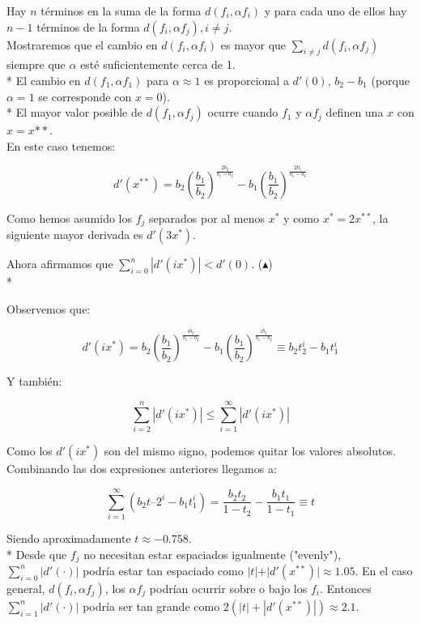 \documentclass[11pt,a4paper]{article}
\begin{document}
\noindent Hay $n$ términos en la suma de la forma $d(f_i, \alpha f_i)$ y para cada uno de ellos hay $n-1$ términos de la forma $d(f_i, \alpha f_j), i \neq j$.\\
Mostraremos que el cambio en $d(f_i, \alpha f_i)$  es mayor que $\sum_{ i \neq j}{ d(f_i, \alpha f_j)}$ siempre que $\alpha$ esté suficientemente cerca de 1. \\*
\noindent El cambio en $d(f_1, \alpha f_1)$ para $\alpha \approx 1$ es proporcional a $d'(0)$, $b_2 - b_1$ (porque $\alpha = 1$ se corresponde con $x = 0$).\\*
\noindent El mayor valor posible de $d(f_1, \alpha f_j)$  ocurre cuando $f_1$ y $\alpha f_j$ definen una $x$ con $x = x{**}$.\\
\noindent En este caso tenemos:

\begin{equation*}
    d'(x^{**}) = b_2 (\frac{b_1}{b_2})^{\frac{2 b_2}{b_1 - b_2}} - b_1 (\frac{b_1}{b_2})^{\frac{2 b_1}{b_1 - b_2}}
\end{equation*}

\noindent Como hemos asumido los $f_j$ separados por al menos $x^{*}$ y como $x^{*} = 2 x^{**}$, la siguiente mayor derivada es $d'(3 x^{*})$. 

\noindent Ahora afirmamos que $\sum_{i=0}^{n} | d'(ix^{*}) | < d'(0)$. ($\blacktriangle$) \\*

\noindent Observemos que:

\begin{equation*}
    d'(ix^{*}) = b_2 \left(\frac{b_1}{b_2} \right)^{\frac{ib_2}{b_1 - b_2}} - b_1 \left( \frac{b_1}{b_2} \right)^{\frac{ib_1}{b_1 - b_2}} \equiv b_2 t_2^{i} - b_1 t_1^{i}
\end{equation*}

Y también:

\begin{equation*}
    \sum_{i = 2}^{n}{ | d'(ix^{*}) |} \leq \sum_{i = 1}^{\infty}{ | d'(ix^{*}) |}
\end{equation*}

Como los $d'(ix^{*})$ son del mismo signo, podemos quitar los valores absolutos. Combinando las dos expresiones anteriores llegamos a:

\begin{equation*}
    \sum_{i = 1}^{\infty}{(b_2t–2^{i} - b_1t_1^{i})} = \frac{b_2t_2}{1-t_2} - \frac{b_1t_1}{1-t_1} \equiv t
\end{equation*}

\noindent Siendo aproximadamente $t \approx -0.758$. \\*
\noindent Desde que $f_j$ no necesitan estar espaciados igualmente ("evenly"), $\sum_{i = 0}^{n} \vert d'(·) \vert$ podría estar tan espaciado como $\vert t \vert + \vert d'(x^{**}) \vert \approx 1.05 $.
En el caso general, $d(f_i, \alpha f_j)$, los $\alpha f_j$ podrían ocurrir sobre o bajo los $f_i$. Entonces $\sum_{i = 1}^{n} \vert d'(·) \vert$ podría ser tan grande como $ 2(| t | + | d'(x^{**}) |) \approx 2.1 $.
\end{document}
